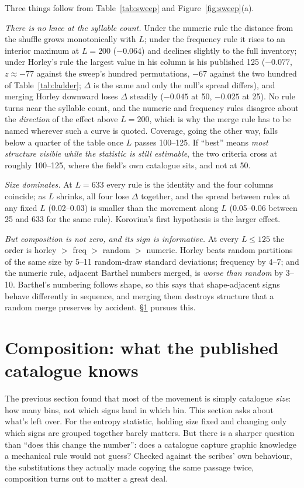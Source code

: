 \documentclass[11pt,a4paper]{article}
\begin{document}
Three things follow from Table~\ref{tab:sweep} and Figure~\ref{fig:sweep}(a).

\emph{There is no knee at the syllable count.} Under the numeric rule the distance from the shuffle grows monotonically with $L$; under the frequency rule it rises to an interior maximum at $L=200$ ($-0.064$) and declines slightly to the full inventory; under Horley's rule the largest value in his column is his published 125 ($-0.077$, $z\approx-77$ against the sweep's hundred permutations, $-67$ against the two hundred of Table~\ref{tab:ladder}; $\Delta$ is the same and only the null's spread differs), and merging Horley downward loses $\Delta$ steadily ($-0.045$ at 50, $-0.025$ at 25). No rule turns near the syllable count, and the numeric and frequency rules disagree about the \emph{direction} of the effect above $L=200$, which is why the merge rule has to be named wherever such a curve is quoted. Coverage, going the other way, falls below a quarter of the table once $L$ passes 100--125. If ``best'' means \emph{most structure visible while the statistic is still estimable}, the two criteria cross at roughly 100--125, where the field's own catalogue sits, and not at 50.

\emph{Size dominates.} At $L=633$ every rule is the identity and the four columns coincide; as $L$ shrinks, all four lose $\Delta$ together, and the spread between rules at any fixed $L$ (0.02--0.03) is smaller than the movement along $L$ (0.05--0.06 between 25 and 633 for the same rule). Korovina's first hypothesis is the larger effect.

\emph{But composition is not zero, and its sign is informative.} At every $L\le125$ the order is horley $>$ freq $>$ random $>$ numeric. Horley beats random partitions of the same size by 5--11 random-draw standard deviations; frequency by 4--7; and the numeric rule, adjacent Barthel numbers merged, is \emph{worse than random} by 3--10. Barthel's numbering follows shape, so this says that shape-adjacent signs behave differently in sequence, and merging them destroys structure that a random merge preserves by accident. \S\ref{sec:composition} pursues this.

\section{Composition: what the published catalogue knows}
\label{sec:composition}

The previous section found that most of the movement is simply catalogue \emph{size}: how many bins, not which signs land in which bin. This section asks about what's left over. For the entropy statistic, holding size fixed and changing only which signs are grouped together barely matters. But there is a sharper question than ``does this change the number'': does a catalogue capture graphic knowledge a mechanical rule would not guess? Checked against the scribes' own behaviour, the substitutions they actually made copying the same passage twice, composition turns out to matter a great deal.
\end{document}
